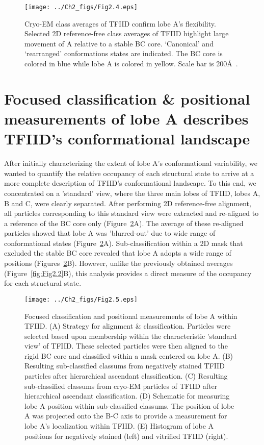 \begin{figure}
\centering
\texttt{[image: ../Ch2\_figs/Fig2.4.eps]}
\caption[Cryo-EM class averages of TFIID confirm lobe A's flexibility]{Cryo-EM class averages of TFIID confirm lobe A’s flexibility. Selected 2D reference-free class averages of TFIID highlight large movement of A relative to a stable BC core.  ‘Canonical’ and ‘rearranged’ conformations states are indicated. The BC core is colored in blue while lobe A is colored in yellow. Scale bar is 200\AA\ .}
\label{fig:Fig2.4}
\end{figure}
\section{Focused classification \& positional measurements of lobe A describes TFIID's conformational landscape}
After initially characterizing the extent of lobe A's conformational variability, we wanted to quantify the relative occupancy of each structural state to arrive at a more complete description of TFIID's conformational landscape. To this end, we concentrated on a 'standard' view, where the three main lobes of TFIID, lobes A, B and C, were clearly separated. After performing 2D reference-free alignment, all particles corresponding to this standard view were extracted and re-aligned to a reference of the BC core only (Figure~\ref{fig:Fig2.5}A). The average of these re-aligned particles showed that lobe A was 'blurred-out' due to wide range of conformational states (Figure~\ref{fig:Fig2.5}A). Sub-classification within a 2D mask that excluded the stable BC core revealed that lobe A adopts a wide range of positions (Figures~\ref{fig:Fig2.5}B). However, unlike the previously obtained averages (Figure~\ref{fig:Fig2.2}B), this analysis provides a direct measure of the occupancy for each structural state. \\
\begin{figure}
\centering
\texttt{[image: ../Ch2\_figs/Fig2.5.eps]}
\caption[Focused classification and positional measurements of lobe A within TFIID]{Focused classification and positional measurements of lobe A within TFIID. (A) Strategy for alignment \& classification.  Particles were selected based upon membership within the characteristic 'standard view' of TFIID.  These selected particles were then aligned to the rigid BC core and classified within a mask centered on lobe A. (B) Resulting sub-classified classums from negatively stained TFIID particles after hierarchical ascendant classification. (C) Resulting sub-classified classums from cryo-EM particles of TFIID after hierarchical ascendant classification. (D) Schematic for measuring lobe A position within sub-classified classums.  The position of lobe A was projected onto the B-C axis to provide a measurement for lobe A’s localization within TFIID. (E) Histogram of lobe A positions for negatively stained (left) and vitrified TFIID (right).}
\label{fig:Fig2.5}
\end{figure}
